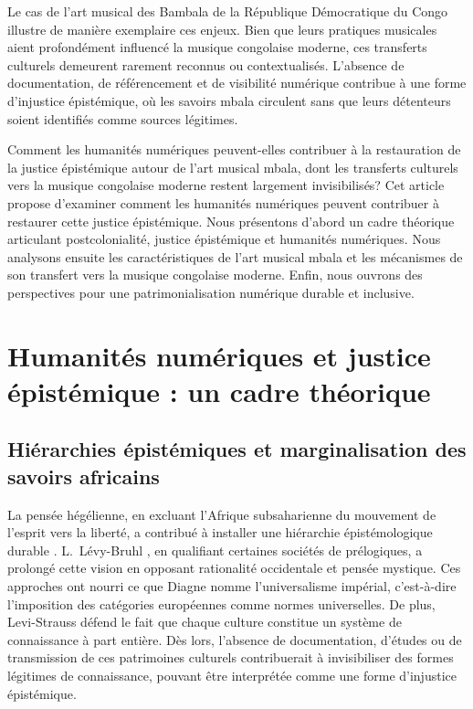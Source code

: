 \documentclass[final,fra]{anthology-ch}         %
\begin{document}
Le cas de l'art musical des Bambala de la République Démocratique du Congo illustre de manière exemplaire ces enjeux. Bien que leurs pratiques musicales aient profondément influencé la musique congolaise moderne, ces transferts culturels demeurent rarement reconnus ou contextualisés. L'absence de documentation, de référencement et de visibilité numérique contribue à une forme d'injustice épistémique, où les savoirs mbala circulent sans que leurs détenteurs soient identifiés comme sources légitimes.

Comment les humanités numériques peuvent-elles contribuer à la restauration de la justice épistémique autour de l'art musical mbala, dont les transferts culturels vers la musique congolaise moderne restent largement invisibilisés? Cet article propose d'examiner comment les humanités numériques peuvent contribuer à restaurer cette justice épistémique. Nous présentons d'abord un cadre théorique articulant postcolonialité, justice épistémique et humanités numériques. Nous analysons ensuite les caractéristiques de l'art musical mbala et les mécanismes de son transfert vers la musique congolaise moderne. Enfin, nous ouvrons des perspectives pour une patrimonialisation numérique durable et inclusive.

\section{Humanités numériques et justice épistémique : un cadre théorique}

\subsection{Hiérarchies épistémiques et marginalisation des savoirs africains}

La pensée hégélienne, en excluant l'Afrique subsaharienne du mouvement
de l'esprit vers la liberté, a contribué à installer une hiérarchie épistémologique durable \cite{hegel2018phenomenologie}. L.~Lévy-Bruhl \cite{levybruhl1951fonctions}, en qualifiant certaines sociétés de \og prélogiques\fg{}, a prolongé cette vision en opposant rationalité occidentale et pensée \og mystique\fg{}. Ces approches ont nourri ce que Diagne \cite{diagne2025universels} nomme \og  l'universalisme impérial\fg{}, c'est-à-dire l'imposition des catégories européennes comme normes universelles. De plus, Levi-Strauss \cite{leviStrauss_pensee_1962} défend le fait  que chaque culture constitue un système de connaissance à part entière. Dès lors, l’absence de documentation, d’études ou de transmission de ces patrimoines culturels contribuerait à invisibiliser des formes légitimes de connaissance, pouvant être interprétée comme une forme d’injustice épistémique.
\end{document}
